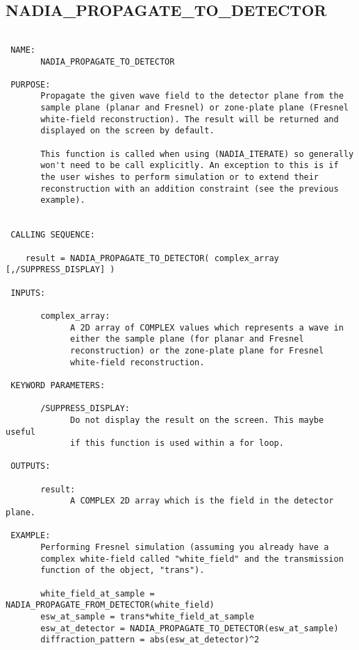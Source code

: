   
 
\subsection{NADIA\_PROPAGATE\_TO\_DETECTOR}
\begin{verbatim}

 NAME:
       NADIA_PROPAGATE_TO_DETECTOR

 PURPOSE:
       Propagate the given wave field to the detector plane from the 
       sample plane (planar and Fresnel) or zone-plate plane (Fresnel
       white-field reconstruction). The result will be returned and
       displayed on the screen by default.

       This function is called when using (NADIA_ITERATE) so generally
       won't need to be call explicitly. An exception to this is if
       the user wishes to perform simulation or to extend their
       reconstruction with an addition constraint (see the previous
       example).


 CALLING SEQUENCE:

	result = NADIA_PROPAGATE_TO_DETECTOR( complex_array [,/SUPPRESS_DISPLAY] )

 INPUTS:

       complex_array:
             A 2D array of COMPLEX values which represents a wave in
             either the sample plane (for planar and Fresnel
             reconstruction) or the zone-plate plane for Fresnel 
             white-field reconstruction.

 KEYWORD PARAMETERS:

       /SUPPRESS_DISPLAY:
             Do not display the result on the screen. This maybe useful
             if this function is used within a for loop. 

 OUTPUTS:

       result:
             A COMPLEX 2D array which is the field in the detector plane.

 EXAMPLE:
       Performing Fresnel simulation (assuming you already have a
       complex white-field called "white_field" and the transmission
       function of the object, "trans").

       white_field_at_sample = NADIA_PROPAGATE_FROM_DETECTOR(white_field)
       esw_at_sample = trans*white_field_at_sample
       esw_at_detector = NADIA_PROPAGATE_TO_DETECTOR(esw_at_sample)
       diffraction_pattern = abs(esw_at_detector)^2

\end{verbatim}






